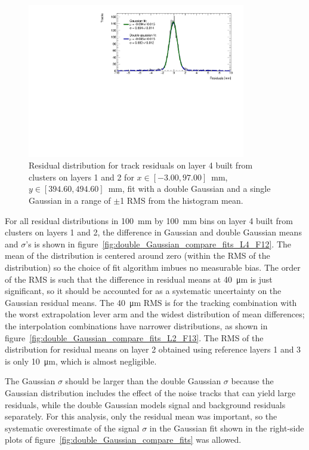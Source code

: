 \begin{figure}
    \centering
    \includegraphics[width = 0.85\textwidth]{figures/figure_double_gaus_vs_gaus_example_fit_QL2P08_3100V_2021-06-18_and_2021-07-19_xbin_10_ybin_5_layer4_fixedlayers12.pdf}
    \caption{Residual distribution for track residuals on layer 4 built from clusters on layers 1 and 2 for $x\in\left[-3.00, 97.00\right]$~mm,  $y\in\left[394.60, 494.60\right]$~mm, fit with a double Gaussian and a single Gaussian in a range of $\pm$1 RMS from the histogram mean.}
    \label{fig:double_Gaussian_example_fit}
\end{figure}

For all residual distributions in \SI{100}{\milli\meter} by \SI{100}{\milli\meter} bins on layer 4 built from clusters on layers 1 and 2, the difference in Gaussian and double Gaussian means and $\sigma$'s is shown in figure~\ref{fig:double_Gaussian_compare_fits_L4_F12}. The mean of the distribution is centered around zero (within the RMS of the distribution) so the choice of fit algorithm imbues no measurable bias. The order of the RMS is such that the difference in residual means at \SI{40}{\micro\meter} is just significant, so it should be accounted for as a systematic uncertainty on the Gaussian residual means. The \SI{40}{\micro\meter} RMS is for the tracking combination with the worst extrapolation lever arm and the widest distribution of mean differences; the interpolation combinations have narrower distributions, as shown in figure~\ref{fig:double_Gaussian_compare_fits_L2_F13}. The RMS of the distribution for residual means on layer 2 obtained using reference layers 1 and 3 is only \SI{10}{\micro\meter}, which is almost negligible.

The Gaussian $\sigma$ should be larger than the double Gaussian $\sigma$ because the Gaussian distribution includes the effect of the noise tracks that can yield large residuals, while the double Gaussian models signal and background residuals separately. For this analysis, only the residual mean was important, so the systematic overestimate of the signal $\sigma$ in the Gaussian fit shown in the right-side plots of figure~\ref{fig:double_Gaussian_compare_fits} was allowed.

